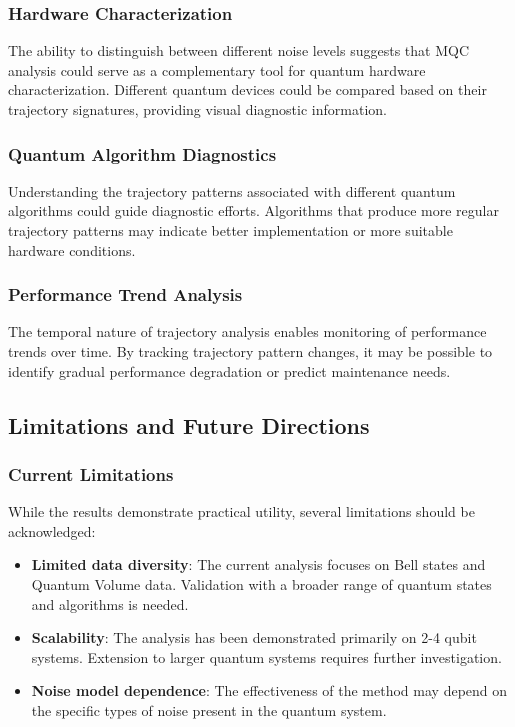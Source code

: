 \subsubsection{Hardware Characterization}
The ability to distinguish between different noise levels suggests that MQC analysis could serve as a complementary tool for quantum hardware characterization. Different quantum devices could be compared based on their trajectory signatures, providing visual diagnostic information.

\subsubsection{Quantum Algorithm Diagnostics}
Understanding the trajectory patterns associated with different quantum algorithms could guide diagnostic efforts. Algorithms that produce more regular trajectory patterns may indicate better implementation or more suitable hardware conditions.

\subsubsection{Performance Trend Analysis}
The temporal nature of trajectory analysis enables monitoring of performance trends over time. By tracking trajectory pattern changes, it may be possible to identify gradual performance degradation or predict maintenance needs.

\subsection{Limitations and Future Directions}

\subsubsection{Current Limitations}
While the results demonstrate practical utility, several limitations should be acknowledged:

\begin{itemize}
\item \textbf{Limited data diversity}: The current analysis focuses on Bell states and Quantum Volume data. Validation with a broader range of quantum states and algorithms is needed.
\item \textbf{Scalability}: The analysis has been demonstrated primarily on 2-4 qubit systems. Extension to larger quantum systems requires further investigation.
\item \textbf{Noise model dependence}: The effectiveness of the method may depend on the specific types of noise present in the quantum system.
\end{itemize}

